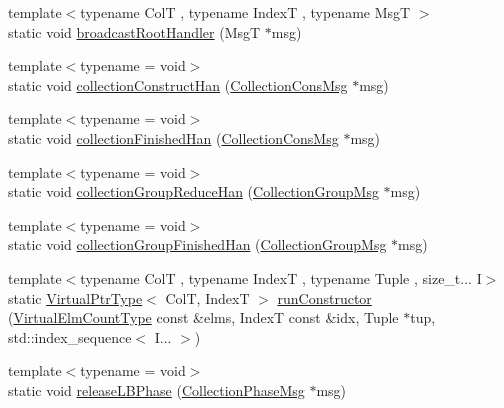 \begin{DoxyCompactItemize}
\item 
{\footnotesize template$<$typename ColT , typename IndexT , typename MsgT $>$ }\\static void \hyperlink{structvt_1_1vrt_1_1collection_1_1_collection_manager_a9859d8346c9aac1fb0b65e6db82969db}{broadcast\+Root\+Handler} (MsgT $\ast$msg)
\item 
{\footnotesize template$<$typename  = void$>$ }\\static void \hyperlink{structvt_1_1vrt_1_1collection_1_1_collection_manager_a904c8dd544474c39593c894b8ca174e0}{collection\+Construct\+Han} (\hyperlink{structvt_1_1vrt_1_1collection_1_1_collection_cons_msg}{Collection\+Cons\+Msg} $\ast$msg)
\item 
{\footnotesize template$<$typename  = void$>$ }\\static void \hyperlink{structvt_1_1vrt_1_1collection_1_1_collection_manager_ad56b5d61a3f1a8286e21076a274dcf17}{collection\+Finished\+Han} (\hyperlink{structvt_1_1vrt_1_1collection_1_1_collection_cons_msg}{Collection\+Cons\+Msg} $\ast$msg)
\item 
{\footnotesize template$<$typename  = void$>$ }\\static void \hyperlink{structvt_1_1vrt_1_1collection_1_1_collection_manager_acf097bb149749c5e8e93d31b84d5a2a3}{collection\+Group\+Reduce\+Han} (\hyperlink{structvt_1_1vrt_1_1collection_1_1_collection_group_msg}{Collection\+Group\+Msg} $\ast$msg)
\item 
{\footnotesize template$<$typename  = void$>$ }\\static void \hyperlink{structvt_1_1vrt_1_1collection_1_1_collection_manager_abf80612ba1db9aadf590f837ae4ca7a7}{collection\+Group\+Finished\+Han} (\hyperlink{structvt_1_1vrt_1_1collection_1_1_collection_group_msg}{Collection\+Group\+Msg} $\ast$msg)
\item 
{\footnotesize template$<$typename ColT , typename IndexT , typename Tuple , size\+\_\+t... I$>$ }\\static \hyperlink{structvt_1_1vrt_1_1collection_1_1_collection_manager_a1da9015e52d6ecca955f57b59aab0b82}{Virtual\+Ptr\+Type}$<$ ColT, IndexT $>$ \hyperlink{structvt_1_1vrt_1_1collection_1_1_collection_manager_a52ce99a3c227bfd77089725c3a173373}{run\+Constructor} (\hyperlink{namespacevt_ac115668758184050beff7a9281a2c490}{Virtual\+Elm\+Count\+Type} const \&elms, IndexT const \&idx, Tuple $\ast$tup, std\+::index\+\_\+sequence$<$ I... $>$)
\item 
{\footnotesize template$<$typename  = void$>$ }\\static void \hyperlink{structvt_1_1vrt_1_1collection_1_1_collection_manager_a3d09a3058dd6984aeff47c89b6d571b3}{release\+L\+B\+Phase} (\hyperlink{structvt_1_1vrt_1_1collection_1_1_collection_phase_msg}{Collection\+Phase\+Msg} $\ast$msg)

\end{DoxyCompactItemize}
